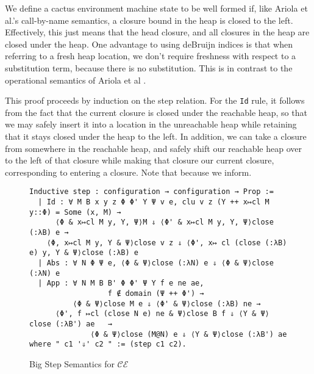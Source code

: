We define a cactus environment machine state to be well formed if, like Ariola 
et al.'s call-by-name semantics, a closure bound in the heap is closed to the
left.  Effectively, this just means that the head closure, and all closures in
the heap are closed under the heap. One advantage to using deBruijn indices is
that when referring to a fresh heap location, we don't require freshness with
respect to a substitution term, because there is no substitution. This is in
contrast to the operational semantics of Ariola et al \cite{ariola1995call}.

This proof proceeds by induction on the step relation. For the \texttt{Id} rule,
it follows from the fact that the current closure is closed under the reachable
heap, so that we may safely insert it into a location in the unreachable heap
while retaining that it stays closed under the heap to the left. In addition, we
can take a closure from somewhere in the reachable heap, and safely shift our
reachable heap over to the left of that closure while making that closure our
current closure, corresponding to entering a closure. Note that because we
inform.     

\begin{figure}
\begin{lstlisting}
Inductive step : configuration → configuration → Prop :=
  | Id : ∀ M B x y z Φ Φ' Υ Ψ v e, clu v z (Υ ++ x↦cl M y::Φ) = Some (x, M) → 
      ⟨Φ & x↦cl M y, Υ, Ψ⟩M ⇓ ⟨Φ' & x↦cl M y, Υ, Ψ⟩close (:λB) e →
    ⟨Φ, x↦cl M y, Υ & Ψ⟩close v z ⇓ ⟨Φ', x↦ cl (close (:λB) e) y, Υ & Ψ⟩close (:λB) e
  | Abs : ∀ N Φ Ψ e, ⟨Φ & Ψ⟩close (:λN) e ⇓ ⟨Φ & Ψ⟩close (:λN) e
  | App : ∀ N M B B' Φ Φ' Ψ Υ f e ne ae, 
                  f ∉ domain (Ψ ++ Φ') → 
          ⟨Φ & Ψ⟩close M e ⇓ ⟨Φ' & Ψ⟩close (:λB) ne → 
      ⟨Φ', f ↦cl (close N e) ne & Ψ⟩close B f ⇓ ⟨Υ & Ψ⟩close (:λB') ae   →
              ⟨Φ & Ψ⟩close (M@N) e ⇓ ⟨Υ & Ψ⟩close (:λB') ae
where " c1 '⇓' c2 " := (step c1 c2).
\end{lstlisting}
\caption{Big Step Semantics for $\mathcal{CE}$}
\label{fig:bigstepcem}
\end{figure}


